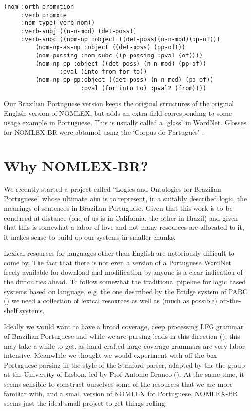 \documentclass{article}
\begin{document}
\begin{verbatim}
(nom :orth promotion
     :verb promote
     :nom-type((verb-nom)) 
     :verb-subj ((n-n-mod) (det-poss))
     :verb-subc ((nom-np :object ((det-poss)(n-n-mod)(pp-of)))
		 (nom-np-as-np :object ((det-poss) (pp-of)))
		 (nom-possing :nom-subc ((p-possing :pval (of))))
		 (nom-np-pp :object ((det-poss) (n-n-mod) (pp-of))
			    :pval (into from for to))
		 (nom-np-pp-pp:object ((det-poss) (n-n-mod) (pp-of))
				      :pval (for into to) :pval2 (from))))
\end{verbatim}

Our Brazilian Portuguese version keeps the original structures of the
original English version of NOMLEX, but adds an extra field
corresponding to some usage example in Portuguese. This is usually
called a `gloss' in WordNet\cite{wordnet}. Glosses for NOMLEX-BR were
obtained using the `Corpus do Portugu\^es' \cite{corpusdoportugues}.


\section{Why NOMLEX-BR?}\label{nomlex-br}

We recently started a project called ``Logics and Ontologies for
Brazilian Portuguese'' whose ultimate aim is to represent, in a
suitably described logic, the meanings of sentences in Brazilian
Portuguese. Given that this work is to be conduced at distance (one of
us is in California, the other in Brazil) and given that this is
somewhat a labor of love and not many resources are allocated to it,
it makes sense to build up our systems in smaller chunks.

Lexical resources for languages other than English are notoriously
difficult to come by. The fact that there is not even a version of a
Portuguese WordNet freely available for download and modification by
anyone is a clear indication of the difficulties ahead. To follow
somewhat the traditional pipeline for logic based systems based on
language, e.g. the one described by the Bridge system of PARC
(\cite{bridge}) we need a collection of lexical resources as well as
(much as possible) off-the-shelf systems.

Ideally we would want to have a broad coverage, deep processing LFG
grammar of Brazilian Portuguese and while we are pursing leads in this
direction (\cite{leonel04}), this may take a while to get, as
hand-crafted large coverage grammars are very labor intensive.
Meanwhile we thought we would experiment with off the box Portuguese
parsing in the style of the Stanford parser, adapted by the the group
at the University of Lisbon, led by Prof Antonio Branco
(\cite{off-the-box}). At the same time, it seems sensible to construct
ourselves some of the resources that we are more familiar with, and a
small version of NOMLEX for Portuguese, NOMLEX-BR seems just the ideal
small project to get things rolling.
\end{document}
